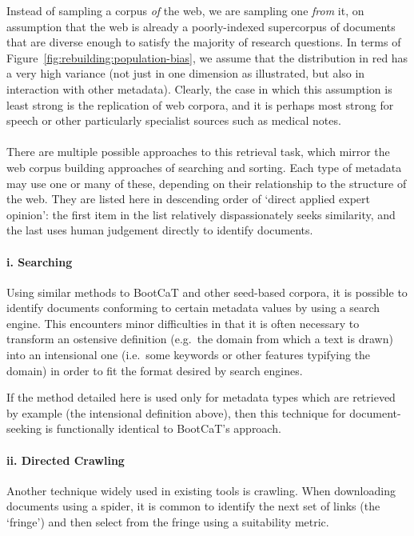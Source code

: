 Instead of sampling a corpus \textsl{of} the web, we are sampling one \textsl{from} it, on assumption that the web is already a poorly-indexed supercorpus of documents that are diverse enough to satisfy the majority of research questions.  In terms of Figure~\ref{fig:rebuilding:population-bias}, we assume that the distribution in red has a very high variance (not just in one dimension as illustrated, but also in interaction with other metadata).  Clearly, the case in which this assumption is least strong is the replication of web corpora, and it is perhaps most strong for speech or other particularly specialist sources such as medical notes.

\paragraph{}

There are multiple possible approaches to this retrieval task, which mirror the web corpus building approaches of searching and sorting.  Each type of metadata may use one or many of these, depending on their relationship to the structure of the web.  They are listed here in descending order of `direct applied expert opinion': the first item in the list relatively dispassionately seeks similarity, and the last uses human judgement directly to identify documents.



\paragraph{i. Searching}
\label{sec:rebuilding:design:searching}
Using similar methods to BootCaT and other seed-based corpora, it is possible to identify documents conforming to certain metadata values by using a search engine.  This encounters minor difficulties in that it is often necessary to transform an ostensive definition (e.g.\ the domain from which a text is drawn) into an intensional one (i.e.\ some keywords or other features typifying the domain) in order to fit the format desired by search engines.

If the method detailed here is used only for metadata types which are retrieved by example (the intensional definition above), then this technique for document-seeking is functionally identical to BootCaT's approach.



\paragraph{ii. Directed Crawling}
Another technique widely used in existing tools is crawling.  When downloading documents using a spider, it is common to identify the next set of links (the `fringe') and then select from the fringe using a suitability metric.

